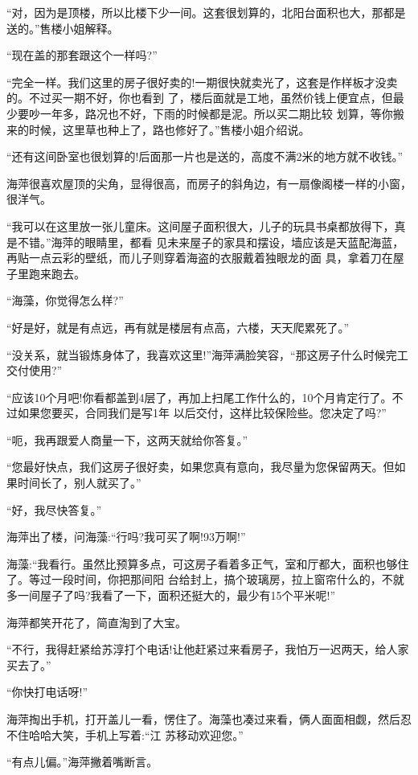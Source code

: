 \documentclass[11pt,a4paper,onecolumn]{article}
\begin{document}
``对，因为是顶楼，所以比楼下少一间。这套很划算的，北阳台面积也大，那都是送的。''售楼小姐解释。

``现在盖的那套跟这个一样吗?''

``完全一样。我们这里的房子很好卖的!一期很快就卖光了，这套是作样板才没卖的。不过买一期不好，你也看到
了，楼后面就是工地，虽然价钱上便宜点，但最少要吵一年多，路况也不好，下雨的时候都是泥。所以买二期比较
划算，等你搬来的时候，这里草也种上了，路也修好了。''售楼小姐介绍说。

``还有这间卧室也很划算的!后面那一片也是送的，高度不满2米的地方就不收钱。''

海萍很喜欢屋顶的尖角，显得很高，而房子的斜角边，有一扇像阁楼一样的小窗，很洋气。

``我可以在这里放一张儿童床。这间屋子面积很大，儿子的玩具书桌都放得下，真是不错。''海萍的眼睛里，都看
见未来屋子的家具和摆设，墙应该是天蓝配海蓝，再贴一点云彩的壁纸，而儿子则穿着海盗的衣服戴着独眼龙的面
具，拿着刀在屋子里跑来跑去。

``海藻，你觉得怎么样?''

``好是好，就是有点远，再有就是楼层有点高，六楼，天天爬累死了。''

``没关系，就当锻炼身体了，我喜欢这里!''海萍满脸笑容，``那这房子什么时候完工交付使用?''

``应该10个月吧!你看都盖到4层了，再加上扫尾工作什么的，10个月肯定行了。不过如果您要买，合同我们是写1年
以后交付，这样比较保险些。您决定了吗?''

``呃，我再跟爱人商量一下，这两天就给你答复。''

``您最好快点，我们这房子很好卖，如果您真有意向，我尽量为您保留两天。但如果时间长了，别人就买了。''

``好，我尽快答复。''

海萍出了楼，问海藻:``行吗?我可买了啊!93万啊!''

海藻:``我看行。虽然比预算多点，可这房子看着多正气，室和厅都大，面积也够住了。等过一段时间，你把那间阳
台给封上，搞个玻璃房，拉上窗帘什么的，不就多一间屋子了吗?我看了一下，面积还挺大的，最少有15个平米呢!''

海萍都笑开花了，简直淘到了大宝。

``不行，我得赶紧给苏淳打个电话!让他赶紧过来看房子，我怕万一迟两天，给人家买去了。''

``你快打电话呀!''

海萍掏出手机，打开盖儿一看，愣住了。海藻也凑过来看，俩人面面相觑，然后忍不住哈哈大笑，手机上写着:``江
苏移动欢迎您。''

``有点儿偏。''海萍撇着嘴断言。
\end{document}
